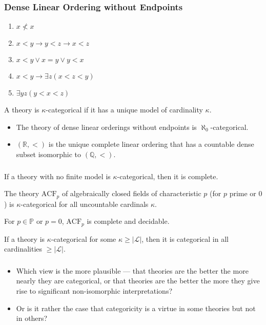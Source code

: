\documentclass[UTF8,11pt,colorlinks,compress,openany]{beamer}%
\begin{document}
\begin{frame}\frametitle{Dense Linear Ordering without Endpoints}
	\begin{enumerate}
		\item $x\nless x$
		\item $x<y\to y<z\to x<z$
		\item $x<y\vee x=y\vee y<x$
		\item $x<y\to\exists z(x<z<y)$
		\item $\exists yz(y<x<z)$
	\end{enumerate}
	\begin{definition}
	A theory is $\kappa$-categorical if it has a unique model of cardinality $\kappa$.
	\end{definition}
	\begin{theorem}[Cantor]
		\begin{itemize}
			\item The theory of dense linear orderings without endpoints is $\aleph_0$-categorical.
			\item $(\mathbb{R},<)$ is the unique complete linear ordering that has a countable dense subset isomorphic to $(\mathbb{Q},<)$.
		\end{itemize}
	\end{theorem}
\end{frame}

\begin{frame}\frametitle{}
	\begin{theorem}
		If a theory with no finite model is $\kappa$-categorical, then it is complete.
	\end{theorem}
	\begin{theorem}
	The theory $\mathrm{ACF}_p$ of algebraically closed fields of characteristic $p$ (for $p$ prime or $0$) is $\kappa$-categorical for all uncountable cardinals $\kappa$.
	\end{theorem}
	\begin{corollary}
	For $p\in\mathbb{P}$ or $p=0$, $\mathrm{ACF}_p$ is complete and decidable.
	\end{corollary}
	\begin{theorem}
		If a theory is $\kappa$-categorical for some $\kappa\geq|\mathscr{L}|$, then it is categorical in all cardinalities $\geq|\mathscr{L}|$.
	\end{theorem}
\end{frame}

\begin{frame}\frametitle{}
\begin{problem}
\begin{itemize}
	\item Which view is the more plausible --- that theories are the better the more nearly they are categorical, or that theories are the better the more they give rise to significant non-isomorphic interpretations?
	\item Or is it rather the case that categoricity is a virtue in some theories but not in others?
\end{itemize}
\end{problem}
\end{frame}
\end{document}

